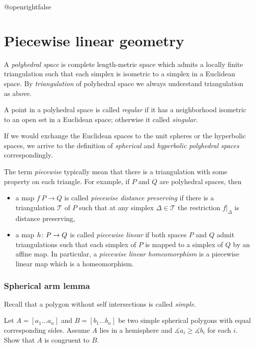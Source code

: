 \csname @openrightfalse\endcsname
\chapter{Piecewise linear geometry}


A \emph{polyhedral space} is complete length-metric space which admits a locally finite triangulation 
such that each simplex is isometric to a simplex in a Euclidean space.
By {}\emph{triangulation} of polyhedral space we always understand triangulation as above. 

A point in a polyhedral space is called \emph{regular} if it has a neighborhood isometric to an open set in a Euclidean space;
otherwise it called {}\emph{singular}.

If we would exchange the Euclidean spaces to the unit spheres or the hyperbolic spaces,
we arrive to the definition of {}\emph{spherical} and {}\emph{hyperbolic polyhedral spaces} correspondingly.

The term \emph{piecewise} typically mean that there is a triangulation with some property on each triangle.
For example,  if $P$ and $Q$ are polyhedral spaces, then
\begin{itemize}
\item a map $f\:P\to Q$ is called {}\emph{piecewise distance preserving} if there is a triangulation $\mathcal{T}$ of $P$ such that at any simplex $\Delta\in \mathcal{T}$ the restriction $f|_\Delta$ is distance preserving,
\item a map $h\:P\z\to Q$  is called {}\emph{piecewise linear} if both spaces $P$ and $Q$ admit triangulations such that each simplex of $P$ is mapped to a simplex of $Q$ by an affine map.
In particular, a {}\emph{piecewise linear homeomorphism} is a piecewise linear map which is a homeomorphism.\label{piecewise linear map}
\end{itemize}





\subsection*{Spherical arm lemma}\label{Spherical arm lemma}

Recall that a polygon without self intersections is called \emph{simple}.

\begin{pr}
Let $A=[a_1\dots a_n]$ and $B=[b_1\dots b_n]$ be two simple spherical polygons 
with equal corresponding sides.
Assume $A$ lies in a hemisphere and $\measuredangle a_i\ge\measuredangle b_i$ for each $i$.
Show that $A$ is congruent to $B$.
\end{pr}

